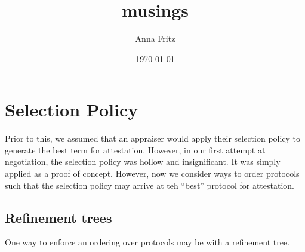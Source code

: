 \documentclass[12pt, letterpaper]{article}
\title{musings}
\author{Anna Fritz}
\date{\today}
\begin{document}
\maketitle
\section{Selection Policy}

Prior to this, we assumed that an appraiser would apply their selection policy to generate the best term for attestation. However, in our first attempt at negotiation, the selection policy was hollow and insignificant. It was simply applied as a proof of concept. However, now we consider ways to order protocols such that the selection policy may arrive at teh ``best'' protocol for attestation. 

\subsection{Refinement trees}

One way to enforce an ordering over protocols may be with a refinement tree. 


\end{document}
